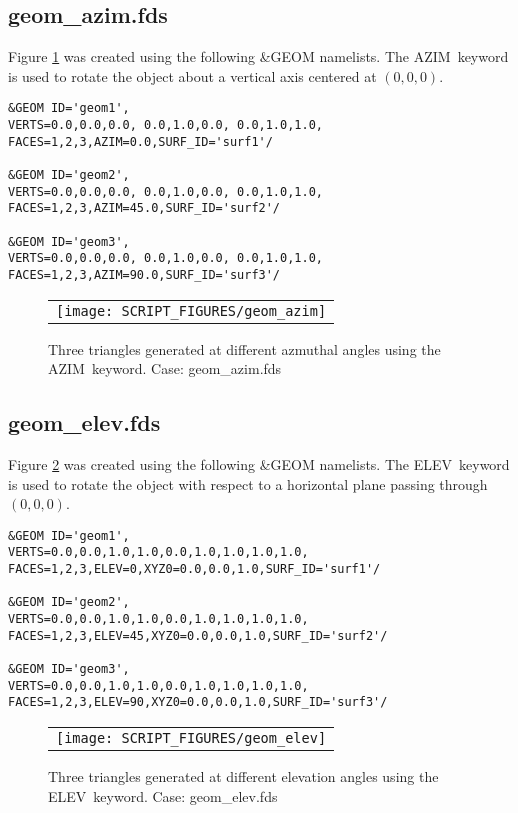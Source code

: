 \documentclass[12pt]{article}
\begin{document}
\subsection{geom\_azim.fds}
Figure \ref{fig:geom_azim} was created using the following \&GEOM namelists.
The {\ct AZIM}\ keyword is used to rotate the object about a vertical axis
centered at $(0,0,0)$.

{\small
\begin{verbatim}
&GEOM ID='geom1',
VERTS=0.0,0.0,0.0, 0.0,1.0,0.0, 0.0,1.0,1.0,
FACES=1,2,3,AZIM=0.0,SURF_ID='surf1'/

&GEOM ID='geom2',
VERTS=0.0,0.0,0.0, 0.0,1.0,0.0, 0.0,1.0,1.0,
FACES=1,2,3,AZIM=45.0,SURF_ID='surf2'/

&GEOM ID='geom3',
VERTS=0.0,0.0,0.0, 0.0,1.0,0.0, 0.0,1.0,1.0,
FACES=1,2,3,AZIM=90.0,SURF_ID='surf3'/
\end{verbatim}
}

\begin{figure}
\begin{center}
\begin{tabular}{c}
 \texttt{[image: SCRIPT\_FIGURES/geom\_azim]}
  \end{tabular}
\end{center}
 \caption{Three triangles generated at different azmuthal angles using the {\ct AZIM}\ keyword. Case: geom\_azim.fds}
\label{fig:geom_azim}
\end{figure}

\subsection{geom\_elev.fds}
Figure \ref{fig:geom_elev} was created using the following \&GEOM namelists.
The {\ct ELEV}\ keyword is used to rotate the object with respect to a horizontal plane
passing through $(0,0,0)$.

{\small
\begin{verbatim}
&GEOM ID='geom1',
VERTS=0.0,0.0,1.0,1.0,0.0,1.0,1.0,1.0,1.0,
FACES=1,2,3,ELEV=0,XYZ0=0.0,0.0,1.0,SURF_ID='surf1'/

&GEOM ID='geom2',
VERTS=0.0,0.0,1.0,1.0,0.0,1.0,1.0,1.0,1.0,
FACES=1,2,3,ELEV=45,XYZ0=0.0,0.0,1.0,SURF_ID='surf2'/

&GEOM ID='geom3',
VERTS=0.0,0.0,1.0,1.0,0.0,1.0,1.0,1.0,1.0,
FACES=1,2,3,ELEV=90,XYZ0=0.0,0.0,1.0,SURF_ID='surf3'/
\end{verbatim}
}

\begin{figure}
\begin{center}
\begin{tabular}{c}
 \texttt{[image: SCRIPT\_FIGURES/geom\_elev]}
  \end{tabular}
\end{center}
 \caption{Three triangles generated at different elevation angles using the {\ct ELEV}\ keyword. Case: geom\_elev.fds}
\label{fig:geom_elev}
\end{figure}
\end{document}

